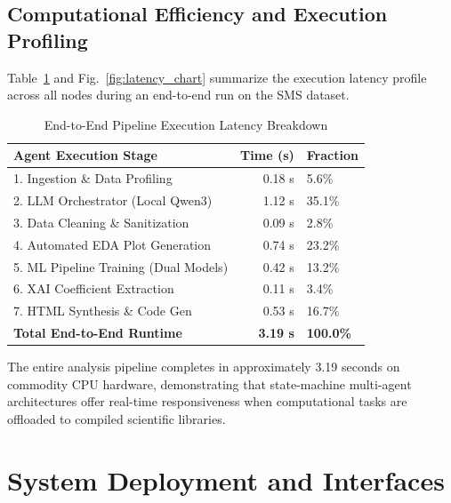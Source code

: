 \documentclass[conference]{IEEEtran}
\begin{document}
\subsection{Computational Efficiency and Execution Profiling}
Table~\ref{tab:latency_breakdown} and Fig.~\ref{fig:latency_chart} summarize the execution latency profile across all nodes during an end-to-end run on the SMS dataset.

\begin{table}[htbp]
\caption{End-to-End Pipeline Execution Latency Breakdown}
\label{tab:latency_breakdown}
\centering
\small
\begin{tabularx}{\columnwidth}{@{}p{}rX@{}}
\toprule
\textbf{Agent Execution Stage} & \textbf{Time (s)} & \textbf{Fraction} \\
\midrule
1. Ingestion \& Data Profiling & 0.18 s & 5.6\% \\
2. LLM Orchestrator (Local Qwen3) & 1.12 s & 35.1\% \\
3. Data Cleaning \& Sanitization & 0.09 s & 2.8\% \\
4. Automated EDA Plot Generation & 0.74 s & 23.2\% \\
5. ML Pipeline Training (Dual Models) & 0.42 s & 13.2\% \\
6. XAI Coefficient Extraction & 0.11 s & 3.4\% \\
7. HTML Synthesis \& Code Gen & 0.53 s & 16.7\% \\
\midrule
\textbf{Total End-to-End Runtime} & \textbf{3.19 s} & \textbf{100.0\%} \\
\bottomrule
\end{tabularx}
\end{table}

The entire analysis pipeline completes in approximately 3.19 seconds on commodity CPU hardware, demonstrating that state-machine multi-agent architectures offer real-time responsiveness when computational tasks are offloaded to compiled scientific libraries.

\section{System Deployment and Interfaces}
\end{document}
